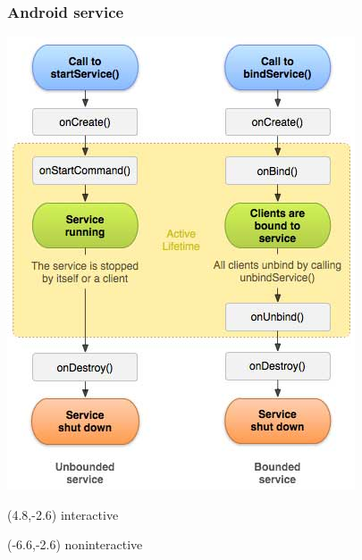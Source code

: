 \documentclass[10pt,xcolor=pdflatex]{beamer}
\begin{document}
\begin{frame}\frametitle{Android service}
	\centering\includegraphics[scale=0.52]{img/pic4.jpg}
\begin{textblock}{15}(4.8,-2.6)
    {\footnotesize interactive}
\end{textblock}
\begin{textblock}{15}(-6.6,-2.6)
    {\footnotesize noninteractive}
\end{textblock}
\end{frame}
\end{document}
